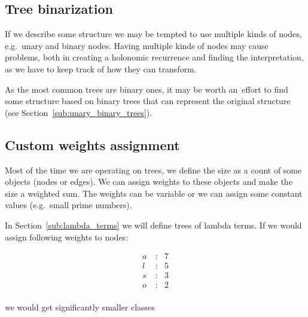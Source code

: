 \documentclass[final]{article}
\theoremstyle{definition}
\theoremstyle{definition}
\theoremstyle{remark}
\begin{document}
\subsection{Tree binarization}%
\label{sub:tree_binarization}

If we describe some structure we may be tempted to use multiple kinds of nodes, e.g.~unary and binary nodes. Having multiple kinds of nodes may cause problems, both in creating a holonomic recurrence and finding the interpretation, as we have to keep track of how they can transform.

As the most common trees are binary ones, it may be worth an~effort to find some structure based on binary trees that can represent the original structure (see Section~\ref{sub:unary_binary_trees}).

\subsection{Custom weights assignment}%
\label{sub:weights_variablization}

Most of the time we are operating on trees, we define the size as a count of some objects (nodes or edges). We can assign weights to these objects and make the size a weighted sum. The weights can be variable or we can assign some constant values (e.g.~small prime numbers).

In Section~\ref{sub:lambda_terms} we will define trees of lambda terms. If we would assign following weights to nodes:

\[\begin{array}{rcl}
        a~&:& 7\\
        l &:& 5\\
        s &:& 3\\
        o &:& 2\\
\end{array}\]

we would get significantly smaller classes
\end{document}
